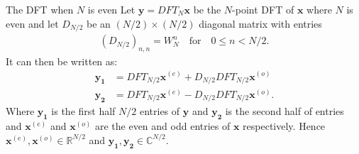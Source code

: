 \begin{theorem}{The DFT when $N$ is even}
    Let $\mathbf{y}=DFT_{N}\mathbf{x}$ be the $N$-point DFT of $\mathbf{x}$ where $N$ is even and let $D_{N/2}$ be an $(N/2)\times(N/2)$ diagonal matrix with entries 
    \begin{align}
        (D_{N/2})_{n,n}=W_N^n \quad \text{for} \quad 0 \leq n< N/2.
        \label{eq:DFTDiagonal}
    \end{align}
    It can then be written as:
    \begin{align*}
         \mathbf{y_1}&=DFT_{N/2}\mathbf{x}^{(e)}+D_{N/2}DFT_{N/2}\mathbf{x}^{(o)}\\ 
         \mathbf{y_2}&=DFT_{N/2}\mathbf{x}^{(e)}-D_{N/2}DFT_{N/2}\mathbf{x}^{(o)}.
    \end{align*}
    Where $\mathbf{y_1}$ is the first half $N/2$ entries of $\mathbf{y}$ and $\mathbf{y_2}$ is the second half of entries and $\mathbf{x}^{(e)}$ and $\mathbf{x}^{(o)}$ are the even and odd entries of $\mathbf{x}$ respectively. Hence $\mathbf{x}^{(e)},\mathbf{x}^{(o)}\in \mathds{R}^{N/2}$ and $\mathbf{y_1},\mathbf{y_2}\in \mathds{C}^{N/2}$. \cite[67]{ryan2019linear}
    \label{theo:DFT_N_even}
\end{theorem}
